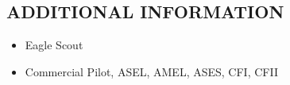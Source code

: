 \documentclass{res}
\begin{document}
\begin{resume}
    \section{ADDITIONAL INFORMATION} 
    	\begin{itemize}
	\setlength\itemsep{0em}
  		\item Eagle Scout  
  		\item Commercial Pilot, ASEL, AMEL, ASES, CFI, CFII
	\end{itemize}           
 
\end{resume}
\end{document}
